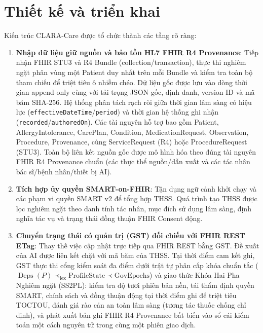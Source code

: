 \documentclass[10pt]{article}
\begin{document}
\section{Thiết kế và triển khai}
Kiến trúc CLARA-Care được tổ chức thành các tầng rõ ràng:
\begin{enumerate}[leftmargin=*]
\item \textbf{Nhập dữ liệu giữ nguồn và bảo tồn HL7 FHIR R4 Provenance}: Tiếp nhận FHIR STU3 và R4 Bundle (collection/transaction), thực thi nghiêm ngặt phân vùng một Patient duy nhất trên mỗi Bundle và kiểm tra toàn bộ tham chiếu để triệt tiêu ô nhiễm chéo. Dữ liệu gốc được lưu vào dòng thời gian append-only cùng với tải trọng JSON gốc, định danh, version ID và mã băm SHA-256. Hệ thống phân tách rạch ròi giữa thời gian lâm sàng có hiệu lực (\texttt{effectiveDateTime}/\texttt{period}) và thời gian hệ thống ghi nhận (\texttt{recorded}/\texttt{authoredOn}). Các tài nguyên hỗ trợ bao gồm Patient, AllergyIntolerance, CarePlan, Condition, MedicationRequest, Observation, Procedure, Provenance, cùng ServiceRequest (R4) hoặc ProcedureRequest (STU3). Toàn bộ liên kết nguồn gốc được mô hình hóa theo đúng tài nguyên FHIR R4 Provenance chuẩn (các thực thể nguồn/dẫn xuất và các tác nhân bác sĩ/bệnh nhân/thiết bị AI).
\item \textbf{Tích hợp ủy quyền SMART-on-FHIR}: Tận dụng ngữ cảnh khởi chạy và các phạm vi quyền SMART v2 để tổng hợp THSS. Quá trình tạo THSS được lọc nghiêm ngặt theo danh tính tác nhân, mục đích sử dụng lâm sàng, định nghĩa tác vụ và trạng thái đồng thuận FHIR Consent động.
\item \textbf{Chuyển trạng thái có quản trị (GST) đối chiếu với FHIR REST ETag}: Thay thế việc cập nhật trực tiếp qua FHIR REST bằng GST. Đề xuất của AI được liên kết chặt với mã băm của THSS. Tại thời điểm cam kết ghi, GST thực thi cổng kiểm soát đa điểm dưới trật tự phân cấp khóa chuẩn tắc ($\operatorname{Deps}(P) \prec_{\text{lex}} \text{ProfileState} \prec \text{GovEpochs}$) và giao thức Khóa Hai Pha Nghiêm ngặt (SS2PL): kiểm tra độ tươi phiên bản nền, tái thẩm định quyền SMART, chính sách và đồng thuận động tại thời điểm ghi để triệt tiêu TOCTOU, đánh giá rào cản an toàn lâm sàng (tương tác thuốc chống chỉ định), và phát xuất bản ghi FHIR R4 Provenance bất biến vào sổ cái kiểm toán một cách nguyên tử trong cùng một phiên giao dịch.
\end{enumerate}
\end{document}
